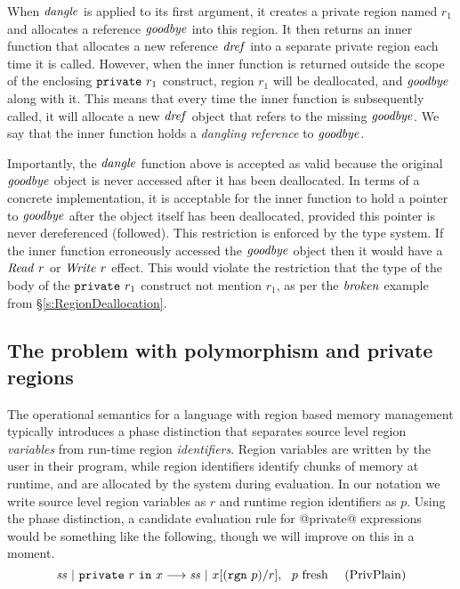 When $\mathit{dangle}$ is applied to its first argument, it creates a private region named $r_1$ and allocates a reference $\mathit{goodbye}$ into this region. It then returns an inner function that allocates a new reference $\mathit{dref}$ into a separate private region each time it is called. However, when the inner function is returned outside the scope of the enclosing $\texttt{private}~ r_1$ construct, region $r_1$ will be deallocated, and $\mathit{goodbye}$ along with it. This means that every time the inner function is subsequently called, it will allocate a new $\mathit{dref}$ object that refers to the missing $\mathit{goodbye}$. We say that the inner function holds a \emph{dangling reference} to $\mathit{goodbye}$.

Importantly, the $\mathit{dangle}$ function above is accepted as valid because the original $\mathit{goodbye}$ object is never accessed after it has been deallocated. In terms of a concrete implementation, it is acceptable for the inner function to hold a pointer to $\mathit{goodbye}$ after the object itself has been deallocated, provided this pointer is never dereferenced (followed). This restriction is enforced by the type system. If the inner function erroneously accessed the $\mathit{goodbye}$ object then it would have a $\mathit{Read}~ r$ or $\mathit{Write}~ r$ effect. This would violate the restriction that the type of the body of the $\texttt{private}~ r_1$ construct not mention $r_1$, as per the $\mathit{broken}$ example from \S\ref{s:RegionDeallocation}. 


\subsection{The problem with polymorphism and private regions}
\label{s:ProblemPrivate}
The operational semantics for a language with region based memory management typically introduces a phase distinction that separates source level region \emph{variables} from run-time region \emph{identifiers}. Region variables are written by the user in their program, while region identifiers identify chunks of memory at runtime, and are allocated by the system during evaluation. In our notation we write source level region variables as $r$ and runtime region identifiers as $p$. Using the phase distinction, a candidate evaluation rule for @private@ expressions would be something like the following, though we will improve on this in a moment.
$$
\mathit{ss} ~|~ \texttt{private}~ r~ \texttt{in}~ x \longrightarrow \mathit{ss} ~|~ x[(\texttt{rgn}~ p)/r],~~ p~ \textrm{fresh}~~~~ (\textrm{PrivPlain})
$$


